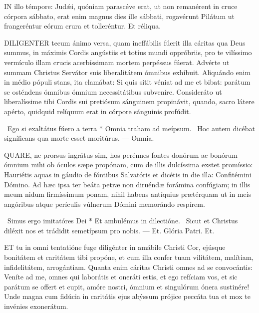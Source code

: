 

\lettrine[lines=2]{I}{N} illo témpore: Judǽi, quóniam parascéve erat, ut non remanérent in cruce córpora sábbato, erat enim magnus dies ille sábbati, rogavérunt Pilátum ut frangeréntur eórum crura et tolleréntur. Et réliqua.



\lettrine[lines=2]{D}{ILIGENTER} tecum ánimo versa, quam ineffábilis fúerit illa cáritas qua Deus summus, in máximis Cordis angústiis et totíus mundi oppróbriis, pro te vilíssimo vermículo illam crucis acerbíssimam mortem perpéssus fúerat. Advérte ut summam Christus Servátor suis liberalitátem ómnibus exhíbuit. Aliquándo enim in médio pópuli stans, ita clamábat: Si quis sitit véniat ad me et bibat: parátum se osténdens ómnibus ómnium necessitátibus subveníre. Consideráto ut liberalíssime tibi Cordis sui pretiósum sánguinem propinávit, quando, sacro látere apérto, quidquid relíquum erat in córpore sánguinis profúdit.

\R\ Ego si exaltátus fúero a terra * Omnia traham ad meípsum. \V\ Hoc autem dicébat signíficans qua morte esset moritúrus. --- Omnia.


\lettrine[lines=2]{Q}{UARE}, ne prorsus ingrátus sim, hos perénnes fontes donórum ac bonórum ómnium mihi ob óculos sæpe propónam, cum de illis dulcíssima exstet promíssio: Hauriétis aquas in gáudio de fóntibus Salvatóris et dicétis in die illa: Confitémini Dómino. Ad hæc ipsa ter beáta petræ non diruéndæ forámina confúgiam; in illis meum nidum firmíssimum ponam, nihil habens antíquius prætérquam ut in meis angóribus atque perículis vúlnerum Dómini memorándo respírem.

\R\ Simus ergo imitatóres Dei * Et ambulémus in dilectióne. \V\ Sicut et Christus diléxit nos et trádidit semetípsum pro nobis. --- Et. Glória Patri. Et.


\lettrine[lines=2]{E}{T} tu in omni tentatióne fuge diligénter in amábile Christi Cor, ejúsque bonitátem et caritátem tibi propóne, et cum illa confer tuam vilitátem, malítiam, infidelitátem, arrogántiam. Quanta enim cáritas Christi omnes ad se convocántis: Veníte ad me, omnes qui laborátis et oneráti estis, et ego refíciam vos, et sic parátum se offert et cupit, amóre nostri, ómnium et singulórum ónera sustinére! Unde magna cum fidúcia in caritátis ejus abýssum prójice peccáta tua et mox te invénies exonerátum.

